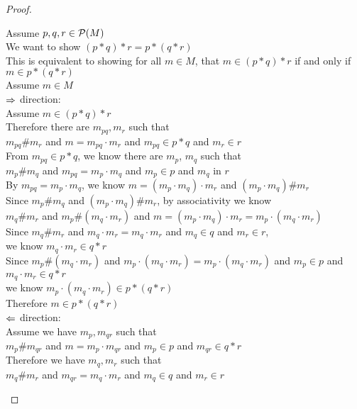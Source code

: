 \begin{proof}
\begin{enumerate}
  \begin{tabbedproof}
    \oo Assume $p, q, r \in \mathcal{P}(M)$ \\
    \oo We want to show $(p * q) * r = p * (q * r)$ \\
    \oo This is equivalent to showing for all $m \in M$, that $m \in (p * q) * r$ if and only if $ m \in p * (q * r)$ \\
    \oo Assume $m \in M$ \\
    \ooo $\Rightarrow$ direction: \\
    \oooo Assume $m \in (p * q) * r$ \\
    \ooooo Therefore there are $m_{pq}, m_r$ such that \\
    \ooooox $m_{pq} \# m_r$ and $m = m_{pq} \cdot m_r$ and $m_{pq} \in p * q$ and $m_r \in r$ \\
    \ooooo From $m_{pq} \in p * q$, we know there are $m_p$, $m_q$ such that \\
    \ooooox $m_p \# m_q$ and $m_{pq} = m_p \cdot m_q$ and $m_p \in p$ and $m_q$ in $r$ \\
    \ooooo By $m_{pq} = m_p \cdot m_q$, we know $m = (m_p \cdot m_q) \cdot m_r$ and $(m_p \cdot m_q) \# m_r$\\
    \ooooo Since $m_p \# m_q$ and $(m_p \cdot m_q) \# m_r$, by associativity we know \\
    \ooooox $m_q \# m_r$ and $m_p \# (m_q \cdot m_r)$ and 
            $m = (m_p \cdot m_q) \cdot m_r = m_p \cdot (m_q \cdot m_r)$ \\
    \ooooo Since $m_q \# m_r$ and $m_q \cdot m_r = m_q \cdot m_r$ and $m_q \in q$ and $m_r \in r$, \\
    \ooooox we know $m_q \cdot m_r \in q * r$ \\
    \ooooo Since $m_p \# (m_q \cdot m_r)$ and $m_p \cdot (m_q \cdot m_r) = m_p \cdot (m_q \cdot m_r)$ and $m_p \in p$ and $m_q \cdot m_r \in q * r$ \\
    \ooooox we know $m_p \cdot (m_q \cdot m_r) \in p * (q * r)$ \\
    \ooooo Therefore $m \in p * (q * r)$ \\
    \ooo $\Leftarrow$ direction: \\
    \oooo Assume we have $m_p, m_{qr}$ such that \\
    \oooox $m_p \# m_{qr}$ and $m = m_p \cdot m_{qr}$ and $m_p \in p$ and $m_{qr} \in q * r$ \\
    \ooooo Therefore we have $m_q, m_r$ such that \\
    \ooooox $m_q \# m_{r}$ and $m_{qr} = m_q \cdot m_r$ and $m_q \in q$ and $m_r \in r$ \\

\end{tabbedproof}
\end{enumerate}
\end{proof}
